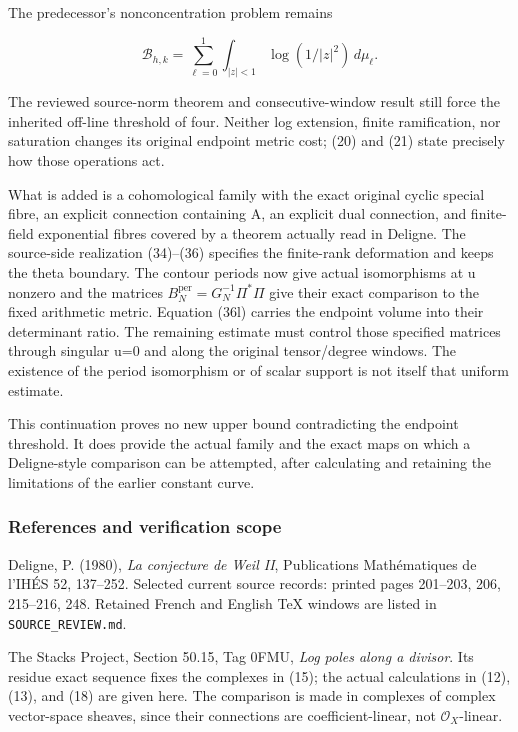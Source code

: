 The predecessor's nonconcentration problem remains

\[
\mathcal B_{h,k}
=\sum_{\ell=0}^1\int_{|z|<1}\log(1/|z|^2)\,d\mu_\ell.
\tag{51}
\]

The reviewed source-norm theorem and consecutive-window result still force the inherited off-line threshold of four. Neither log extension, finite ramification, nor saturation changes its original endpoint metric cost; (20) and (21) state precisely how those operations act.

What is added is a cohomological family with the exact original cyclic special fibre, an explicit connection containing A, an explicit dual connection, and finite-field exponential fibres covered by a theorem actually read in Deligne. The source-side realization (34)--(36) specifies the finite-rank deformation and keeps the theta boundary. The contour periods now give actual isomorphisms at u nonzero and the matrices \(B_N^{\mathrm{per}}=G_N^{-1}\Pi^*\Pi\) give their exact comparison to the fixed arithmetic metric. Equation (36l) carries the endpoint volume into their determinant ratio. The remaining estimate must control those specified matrices through singular u=0 and along the original tensor/degree windows. The existence of the period isomorphism or of scalar support is not itself that uniform estimate.

This continuation proves no new upper bound contradicting the endpoint threshold. It does provide the actual family and the exact maps on which a Deligne-style comparison can be attempted, after calculating and retaining the limitations of the earlier constant curve.

\subsubsection{References and verification scope}\label{endpoint-exponential_original--references-and-verification-scope}

Deligne, P. (1980), \emph{La conjecture de Weil II}, Publications Mathématiques de l'IHÉS 52, 137--252. Selected current source records: printed pages 201--203, 206, 215--216, 248. Retained French and English TeX windows are listed in \nolinkurl{SOURCE_REVIEW.md}.

The Stacks Project, Section 50.15, Tag 0FMU, \emph{Log poles along a divisor}. Its residue exact sequence fixes the complexes in (15); the actual calculations in (12), (13), and (18) are given here. The comparison is made in complexes of complex vector-space sheaves, since their connections are coefficient-linear, not \(\mathcal O_X\)-linear.

